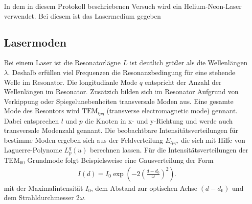 In dem in diesem Protokoll beschriebenen
Versuch wird ein Helium-Neon-Laser verwendet.
Bei diesem ist das Lasermedium gegeben






\subsection{Lasermoden}
\label{subsec:lasermoden}
Bei einem Laser ist die
Resonatorlägne $L$ ist deutlich größer
als die Wellenlängen $\lambda$. Deshalb erfüllen viel Frequenzen
die Resonanzbedingung für eine stehende Welle im Resonator.
Die longitudianle Mode $q$ entspricht der Anzahl der Wellenlängen
im Resonator. Zusätzich bilden sich im Resonator
Aufgrund von Verkippung oder Spiegelunebenheiten
transversale Moden aus.
Eine gesamte Mode des Resontors wird
$\text{TEM}_{lpq}$ (transverse electromagnetic mode)
gennant. Dabei entsprechen $l$ und $p$ die Knoten in
x- und y-Richtung und werde auch
transversale Modenzahl gennant.
Die beobachtbare Intensitätsverteilungen für bestimme Moden
ergeben sich aus der Feldverteilung $E_{lpq}$, die
sich mit Hilfe von Laguerre-Polynome $L_p^q(u)$
berechnen lassen. Für
die Intensitätsverteilungen der $\text{TEM}_{00}$ Grundmode folgt Beispielsweise
eine Gausverteilung der Form
\begin{align}
I(d)=I_0\exp\left(-2\left(\frac{d-d_0}{\omega}\right)^2\right).
\end{align}
mit der Maximalintensität $I_0$, dem Abstand zur optischen Achse $(d-d_0)$
und dem Strahldurchmesser $2\omega$.
